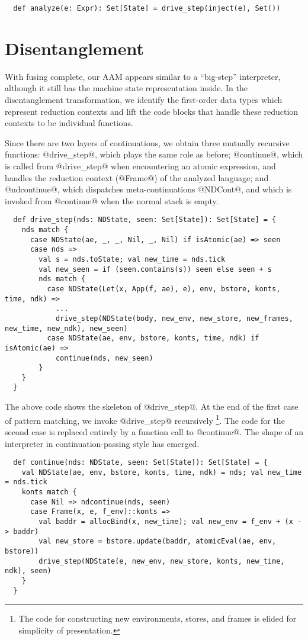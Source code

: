 \documentclass[acmsmall, review]{acmart}\settopmatter{}
\begin{document}
\begin{lstlisting}
  def analyze(e: Expr): Set[State] = drive_step(inject(e), Set())
\end{lstlisting}

\section{Disentanglement} \label{disen}

With fusing complete, our AAM appears similar to a ``big-step'' interpreter, although it
still has the machine state representation inside. In the disentanglement transformation,
we identify the first-order data types which represent reduction contexts
and lift the code blocks that handle these reduction contexts to be individual functions.

Since there are two layers of continuations, we obtain three mutually recursive functions:
@drive_step@, which plays the same role as before; @continue@, which is called from
@drive_step@ when encountering an atomic expression, and handles the reduction context
(@Frame@) of the analyzed language; and @ndcontinue@, which dispatches meta-continuations
@NDCont@, and which is invoked from @continue@ when the normal stack is empty.

\begin{lstlisting}
  def drive_step(nds: NDState, seen: Set[State]): Set[State] = {
    nds match {
      case NDState(ae, _, _, Nil, _, Nil) if isAtomic(ae) => seen
      case nds =>
        val s = nds.toState; val new_time = nds.tick
        val new_seen = if (seen.contains(s)) seen else seen + s
        nds match {
          case NDState(Let(x, App(f, ae), e), env, bstore, konts, time, ndk) =>
            ...
            drive_step(NDState(body, new_env, new_store, new_frames, new_time, new_ndk), new_seen)
          case NDState(ae, env, bstore, konts, time, ndk) if isAtomic(ae) =>
            continue(nds, new_seen)
        }
    }
  }
\end{lstlisting}

The above code shows the skeleton of @drive_step@.
At the end of the first case of pattern matching, we invoke @drive_step@ recursively 
\footnote{The code for constructing new environments, stores, and frames is elided for 
simplicity of presentation.}.
The code for the second case is replaced entirely by a function call to @continue@.
The shape of an interpreter in continuation-passing style has emerged.

\begin{lstlisting}
  def continue(nds: NDState, seen: Set[State]): Set[State] = {
    val NDState(ae, env, bstore, konts, time, ndk) = nds; val new_time = nds.tick
    konts match {
      case Nil => ndcontinue(nds, seen)
      case Frame(x, e, f_env)::konts =>
        val baddr = allocBind(x, new_time); val new_env = f_env + (x -> baddr)
        val new_store = bstore.update(baddr, atomicEval(ae, env, bstore))
        drive_step(NDState(e, new_env, new_store, konts, new_time, ndk), seen)
    }
  }
\end{lstlisting}
\end{document}
